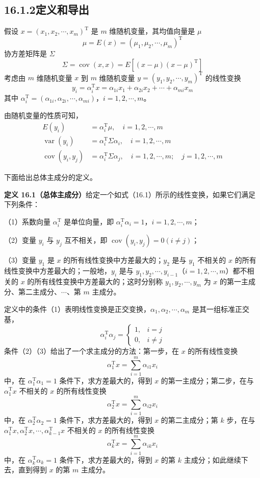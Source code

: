 \documentclass[UTF8, 12pt, fontset=fandol, oneside]{ctexart}
\begin{document}
\subsection*{16.1.2\quad 定义和导出}

假设 $x=(x_1,x_2,\cdots,x_m)^{\mathrm{T}}$ 是 $m$ 维随机变量，其均值向量是 $\mu$
\[
\mu=E(x)=(\mu_1,\mu_2,\cdots,\mu_m)^{\mathrm{T}}
\]
协方差矩阵是 $\Sigma$
\[
\Sigma=\operatorname{cov}(x,x)=E[(x-\mu)(x-\mu)^{\mathrm{T}}]
\]
考虑由 $m$ 维随机变量 $x$ 到 $m$ 维随机变量 $y=(y_1,y_2,\cdots,y_m)^{\mathrm{T}}$ 的线性变换
\begin{equation}
y_i=\alpha_i^{\mathrm{T}}x=\alpha_{1i}x_1+\alpha_{2i}x_2+\cdots+\alpha_{mi}x_m
\tag{16.1}
\end{equation}
其中 $\alpha_i^{\mathrm{T}}=(\alpha_{1i},\alpha_{2i},\cdots,\alpha_{mi})$，$i=1,2,\cdots,m$。

由随机变量的性质可知，
\begin{align}
E(y_i)&=\alpha_i^{\mathrm{T}}\mu,\quad i=1,2,\cdots,m \tag{16.2}\\
\operatorname{var}(y_i)&=\alpha_i^{\mathrm{T}}\Sigma\alpha_i,\quad i=1,2,\cdots,m \tag{16.3}\\
\operatorname{cov}(y_i,y_j)&=\alpha_i^{\mathrm{T}}\Sigma\alpha_j,\quad i=1,2,\cdots,m;\quad j=1,2,\cdots,m \tag{16.4}
\end{align}

下面给出总体主成分的定义。

\noindent\textbf{定义 16.1（总体主成分）}\quad 给定一个如式（16.1）所示的线性变换，如果它们满足下列条件：

（1）系数向量 $\alpha_i^{\mathrm{T}}$ 是单位向量，即 $\alpha_i^{\mathrm{T}}\alpha_i=1$，$i=1,2,\cdots,m$；

（2）变量 $y_i$ 与 $y_j$ 互不相关，即 $\operatorname{cov}(y_i,y_j)=0(i\neq j)$；

（3）变量 $y_1$ 是 $x$ 的所有线性变换中方差最大的；$y_2$ 是与 $y_1$ 不相关的 $x$ 的所有线性变换中方差最大的；一般地，$y_i$ 是与 $y_1,y_2,\cdots,y_{i-1}$（$i=1,2,\cdots,m$）都不相关的 $x$ 的所有线性变换中方差最大的；这时分别称 $y_1,y_2,\cdots,y_m$ 为 $x$ 的第一主成分、第二主成分、$\cdots$、第 $m$ 主成分。

定义中的条件（1）表明线性变换是正交变换，$\alpha_1,\alpha_2,\cdots,\alpha_m$ 是其一组标准正交基，
\[
\alpha_i^{\mathrm{T}}\alpha_j=
\begin{cases}
1, & i=j\\
0, & i\neq j
\end{cases}
\]
条件（2）（3）给出了一个求主成分的方法：第一步，在 $x$ 的所有线性变换
\[
\alpha_1^{\mathrm{T}}x=\sum_{i=1}^m\alpha_{i1}x_i
\]
中，在 $\alpha_1^{\mathrm{T}}\alpha_1=1$ 条件下，求方差最大的，得到 $x$ 的第一主成分；第二步，在与 $\alpha_1^{\mathrm{T}}x$ 不相关的 $x$ 的所有线性变换
\[
\alpha_2^{\mathrm{T}}x=\sum_{i=1}^m\alpha_{i2}x_i
\]
中，在 $\alpha_2^{\mathrm{T}}\alpha_2=1$ 条件下，求方差最大的，得到 $x$ 的第二主成分；第 $k$ 步，在与 $\alpha_1^{\mathrm{T}}x,\alpha_2^{\mathrm{T}}x,\cdots,\alpha_{k-1}^{\mathrm{T}}x$ 不相关的 $x$ 的所有线性变换
\[
\alpha_k^{\mathrm{T}}x=\sum_{i=1}^m\alpha_{ik}x_i
\]
中，在 $\alpha_k^{\mathrm{T}}\alpha_k=1$ 条件下，求方差最大的，得到 $x$ 的第 $k$ 主成分；如此继续下去，直到得到 $x$ 的第 $m$ 主成分。
\end{document}
